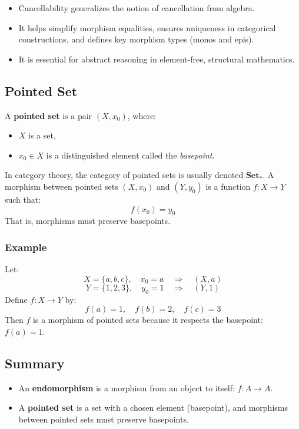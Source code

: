 \documentclass[10pt]{article}
\theoremstyle{plain}
\theoremstyle{definition}
\begin{document}
\begin{itemize}
	\item Cancellability generalizes the notion of cancellation from algebra.
	\item It helps simplify morphism equalities, ensures uniqueness in categorical constructions, and defines key morphism types (monos and epis).
	\item It is essential for abstract reasoning in element-free, structural mathematics.
\end{itemize}


\subsection*{Pointed Set}

A \textbf{pointed set} is a pair \( (X, x_0) \), where:
\begin{itemize}
	\item \( X \) is a set,
	\item \( x_0 \in X \) is a distinguished element called the \emph{basepoint}.
\end{itemize}

In category theory, the category of pointed sets is usually denoted \( \textbf{Set}_* \). A morphism between pointed sets \( (X, x_0) \) and \( (Y, y_0) \) is a function \( f: X \to Y \) such that:
\[
f(x_0) = y_0
\]
That is, morphisms must preserve basepoints.

\subsubsection*{Example}

Let:
\[
X = \{a, b, c\}, \quad x_0 = a \quad \Rightarrow \quad (X, a)
\]
\[
Y = \{1, 2, 3\}, \quad y_0 = 1 \quad \Rightarrow \quad (Y, 1)
\]
Define \( f: X \to Y \) by:
\[
f(a) = 1, \quad f(b) = 2, \quad f(c) = 3
\]
Then \( f \) is a morphism of pointed sets because it respects the basepoint: \( f(a) = 1 \).

\subsection*{Summary}

\begin{itemize}
	\item An \textbf{endomorphism} is a morphism from an object to itself: \( f: A \to A \).
	\item A \textbf{pointed set} is a set with a chosen element (basepoint), and morphisms between pointed sets must preserve basepoints.
\end{itemize}
\end{document}
